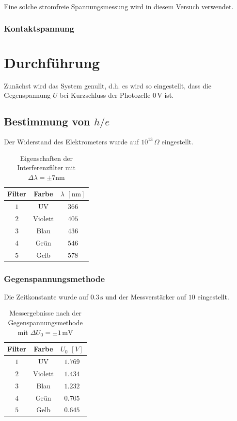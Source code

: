 \documentclass[12pt,a4paper]{scrartcl}
\numberwithin{equation}{section} %
\begin{document}
Eine solche stromfreie Spannungsmessung wird in diesem Versuch verwendet.

\subsubsection{Kontaktspannung}

\clearpage
\hypertarget{durchfuxfchrung}{%
\section{Durchführung}\label{durchfuxfchrung}}
Zunächst wird das System genullt, d.h. es wird so eingestellt, dass die Gegenspannung $U$ bei Kurzschluss der Photozelle $0\mathrm{\,V}$ ist.

\subsection{Bestimmung von $h/e$}
Der Widerstand des Elektrometers wurde auf $10^{13}\,\Omega$ eingestellt.

\begin{table}[h!]
	\centering
	\begin{tabular}{c|c|c}
		Filter & Farbe & $\lambda$ $[\mathrm{nm}]$ \\
		\hline
		$1$ & UV & $366$ \\
		$2$ & Violett & $405$ \\
		$3$ & Blau & $436$ \\
		$4$ & Grün & $546$ \\
		$5$ & Gelb & $578$ \\
	\end{tabular}
	\caption{Eigenschaften der Interferenzfilter mit $\Delta \lambda = \pm 7\mathrm{nm}$}
	\label{tab:Interferenzfilter}
\end{table}

\subsubsection{Gegenspannungsmethode}
Die Zeitkonstante wurde auf $0.3\mathrm{\,s}$ und der Messverstärker auf $10$ eingestellt.

\begin{table}[h!]
	\centering
	\begin{tabular}{c|c|c}
		Filter & Farbe & $U_0$ $[V]$ \\
		\hline
		$1$ & UV & $1.769$ \\
		$2$ & Violett & $1.434$ \\
		$3$ & Blau & $1.232$ \\
		$4$ & Grün & $0.705$ \\
		$5$ & Gelb & $0.645$ \\
	\end{tabular}
	\caption{Messergebnisse nach der Gegenspannungsmethode mit $\Delta U_0=\pm 1\mathrm{\,mV}$}
	\label{tab:Gegenspannungsmethode}
\end{table}
\end{document}
